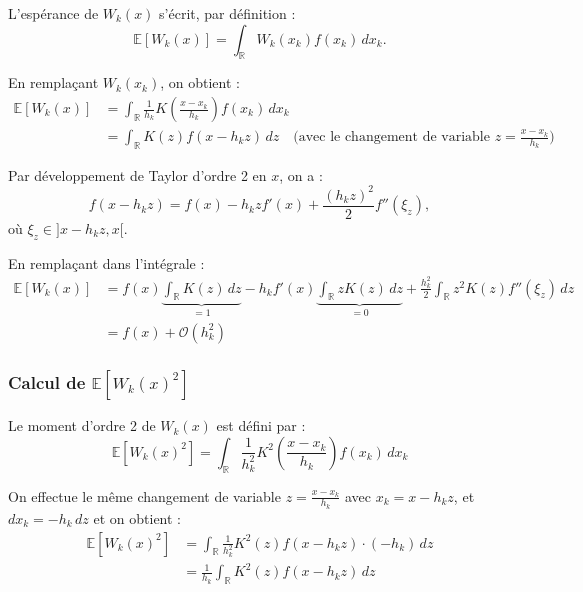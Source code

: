 \documentclass[12pt]{article}
\begin{document}
L’espérance de \( W_k(x) \) s’écrit, par définition :
\begin{equation}
\mathbb{E}[W_k(x)] = \int_{\mathbb{R}} W_k(x_k) f(x_k) \, dx_k. \label{eq:esp}
\end{equation}

En remplaçant \( W_k(x_k) \), on obtient :
\begin{align}
\mathbb{E}[W_k(x)] 
&= \int_{\mathbb{R}} \frac{1}{h_k} K\left( \frac{x - x_k}{h_k} \right) f(x_k) \, dx_k \label{eq:esp1} \\
&= \int_{\mathbb{R}} K(z) f(x - h_k z) \, dz 
\quad \text{(avec le changement de variable } z = \tfrac{x - x_k}{h_k}) \label{eq:esp2}
\end{align}

Par développement de Taylor d’ordre 2 en \( x \), on a :
\begin{equation}
f(x - h_k z) = f(x) - h_k z f'(x) + \frac{(h_k z)^2}{2} f''(\xi_z), \label{eq:taylor}
\end{equation}
où \( \xi_z \in ]x - h_k z, x[ \).

En remplaçant dans l’intégrale :
\begin{align}
\mathbb{E}[W_k(x)] 
&= f(x) \underbrace{\int_{\mathbb{R}} K(z) \, dz}_{=1}
- h_k f'(x) \underbrace{\int_{\mathbb{R}} z K(z) \, dz}_{=0}
+ \frac{h_k^2}{2} \int_{\mathbb{R}} z^2 K(z) f''(\xi_z) \, dz \label{eq:finaldev} \\
&= f(x) + \mathcal{O}(h_k^2) \label{eq:final}
\end{align}


\subsubsection*{Calcul de \( \mathbb{E}[W_k(x)^2] \)}
\setcounter{equation}{0}

Le moment d’ordre 2 de \( W_k(x) \) est défini par :
\begin{equation}
\mathbb{E}[W_k(x)^2] = \int_{\mathbb{R}} \frac{1}{h_k^2} K^2\left( \frac{x - x_k}{h_k} \right) f(x_k) \, dx_k
\end{equation}

On effectue le même changement de variable \( z = \frac{x - x_k}{h_k} \) avec \( x_k = x - h_k z \), et \( dx_k = -h_k \, dz \) et on obtient :
\begin{align}
\mathbb{E}[W_k(x)^2] 
&= \int_{\mathbb{R}} \frac{1}{h_k^2} K^2(z) f(x - h_k z) \cdot (-h_k) \, dz \\
&= \frac{1}{h_k} \int_{\mathbb{R}} K^2(z) f(x - h_k z) \, dz
\end{align}
\end{document}
